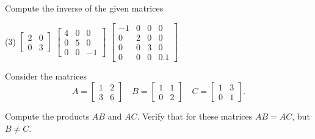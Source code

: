 \documentclass{ximera}
\begin{document}
\begin{exercise}%
    Compute the inverse of the given matrices
    \begin{tasks}(3)
        \task
        $\begin{bmatrix}
            2 & 0 \\
            0 & 3 
        \end{bmatrix}$
        \task
        $\begin{bmatrix}
            4 & 0 & 0 \\
            0 & 5 & 0 \\ 
            0 & 0 & -1
        \end{bmatrix}$
        \task
        $\begin{bmatrix}
            -1 & 0 & 0 & 0 \\
            0 & 2 & 0 & 0 \\ 
            0 & 0 & 3 & 0 \\
            0 & 0 & 0 & 0.1
        \end{bmatrix}$
    \end{tasks}
\end{exercise}

\begin{exercise}
    Consider the matrices
    \begin{equation*}
        A = \begin{bmatrix} 1 & 2 \\ 3 & 6 \end{bmatrix} \quad B = \begin{bmatrix} 1 & 1 \\ 0 & 2 \end{bmatrix} \quad C = \begin{bmatrix} 1 & 3 \\ 0 & 1 \end{bmatrix}.
    \end{equation*}
    \begin{tasks}
        \task Compute the products $AB$ and $AC$.
        \task Verify that for these matrices $AB = AC$, but $B \neq C$.
    \end{tasks}
\end{exercise}
\end{document}

